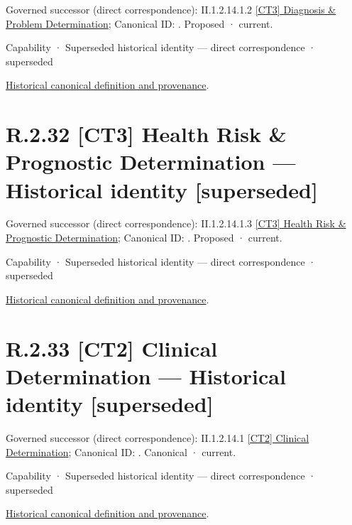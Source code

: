 {\small Governed successor (direct correspondence): II.1.2.14.1.2 \hyperref[element:d965032637e64275b7a61c0413834590]{[CT3] Diagnosis \& Problem Determination}; Canonical ID: \texttt{}. Proposed · current.}\par
\label{element:e575c583783546ef85cf898523d18797}
{\small Capability · Superseded historical identity — direct correspondence · superseded}\par
\href{../../../../continuum/strategy/capability/e575c583783546ef85cf898523d18797.md}{Historical canonical definition and provenance}.\par
\section*{R.2.32 [CT3] Health Risk \& Prognostic Determination — Historical identity [superseded]}
\label{navigation:R.2.32}

{\small Governed successor (direct correspondence): II.1.2.14.1.3 \hyperref[element:5bba0ea969814b5fa7ad11b67ab40a0c]{[CT3] Health Risk \& Prognostic Determination}; Canonical ID: \texttt{}. Proposed · current.}\par
\label{element:3215f0b0e1ce45e8ab16dae272ea6fe7}
{\small Capability · Superseded historical identity — direct correspondence · superseded}\par
\href{../../../../continuum/strategy/capability/3215f0b0e1ce45e8ab16dae272ea6fe7.md}{Historical canonical definition and provenance}.\par
\section*{R.2.33 [CT2] Clinical Determination — Historical identity [superseded]}
\label{navigation:R.2.33}

{\small Governed successor (direct correspondence): II.1.2.14.1 \hyperref[element:39219464b6304b59bd7c3de4e237066e]{[CT2] Clinical Determination}; Canonical ID: \texttt{}. Canonical · current.}\par
\label{element:018ccd818ec142fba1ffb086d900acc6}
{\small Capability · Superseded historical identity — direct correspondence · superseded}\par
\href{../../../../continuum/strategy/capability/018ccd818ec142fba1ffb086d900acc6.md}{Historical canonical definition and provenance}.\par
